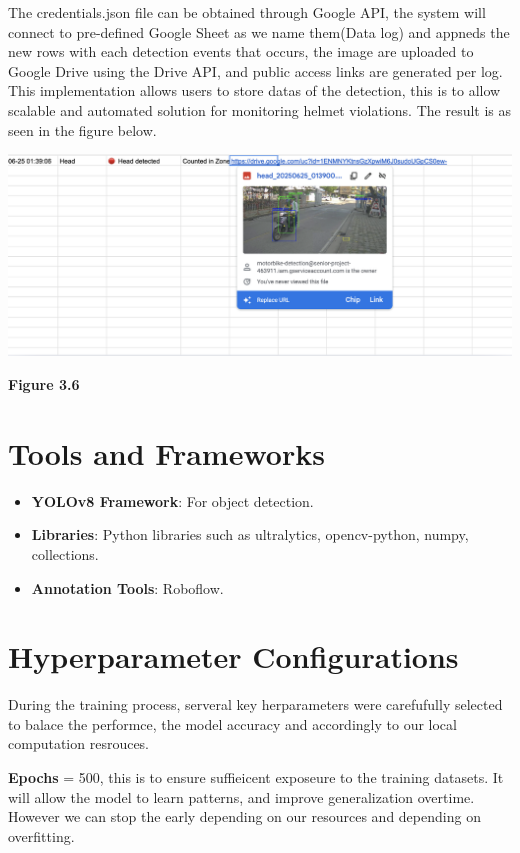 \noindent\hspace{2.5em}The credentials.json file can be obtained through Google API, the system will connect to pre-defined Google Sheet as we name them(Data log) and appneds the new rows with each detection events that occurs, the image are uploaded to Google Drive using the Drive API, and public access links are generated per log. This implementation allows users to store datas of the detection, this is to allow scalable and automated solution for monitoring helmet violations. The result is as seen in the figure below.

\begin{center}
	\includegraphics[width=1\textwidth]{api.png}
	
	\vspace{0.5em}
	\textbf{Figure 3.6}
\end{center}

\section{Tools and Frameworks}
\begin{itemize}
	\item \textbf{YOLOv8 Framework}: For object detection.
	\item \textbf{Libraries}: Python libraries such as ultralytics, opencv-python, numpy, collections.
	\item \textbf{Annotation Tools}: Roboflow.
	
\end{itemize}


\section{Hyperparameter Configurations}
During the training process, serveral key herparameters were carefufully selected to balace the performce, the model accuracy and accordingly to our local computation resrouces.

\textbf{Epochs} = 500, this is to ensure suffieicent exposeure to the training datasets. It will allow the model to learn patterns, and improve generalization overtime. However we can stop the early depending on our resources and depending on overfitting.

